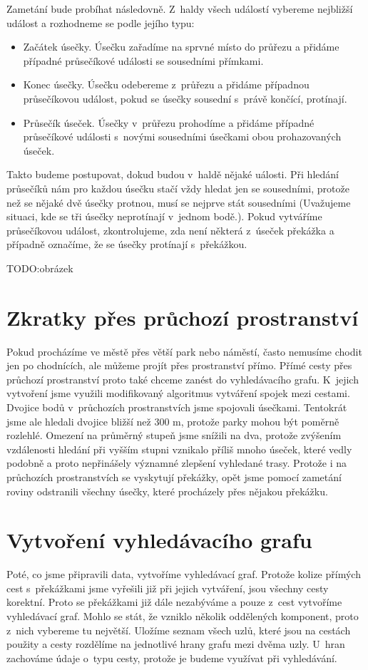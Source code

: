 Zametání bude probíhat následovně. Z~haldy všech událostí vybereme nejbližší
událost a rozhodneme se podle jejího typu:
\begin{itemize}
	\item {\tuc Začátek úsečky.}  Úsečku zařadíme na sprvné místo do
	průřezu a přidáme případné průsečíkové události se sousedními přímkami.
	\item {\tuc Konec úsečky.} Úsečku odebereme z~průřezu a přidáme
	případnou průsečíkovou událost, pokud se úsečky sousední s~právě
	končící, protínají.
	\item {\tuc Průsečík úseček.} Úsečky v~průřezu prohodíme a přidáme
	případné průsečíkové události s~novými sousedními úsečkami obou
	prohazovaných úseček.
\end{itemize}
Takto budeme postupovat, dokud budou v~haldě nějaké uálosti. Při hledání
průsečíků nám pro každou úsečku stačí vždy hledat jen se sousedními, protože než
se nějaké dvě úsečky protnou, musí se nejprve stát sousedními (Uvažujeme
situaci, kde se tři úsečky neprotínají v~jednom bodě.). Pokud vytváříme
průsečíkovou událost, zkontrolujeme, zda není některá z~úseček překážka a
případně označíme, že se úsečky protínají s~překážkou. 

TODO:obrázek

\section{Zkratky přes průchozí prostranství}
Pokud procházíme ve městě přes větší park nebo náměstí, často nemusíme chodit
jen po chodnících, ale můžeme projít přes prostranství přímo. Přímé cesty přes
průchozí prostranství proto také chceme zanést do vyhledávacího grafu. K~jejich
vytvoření jsme využili modifikovaný algoritmus vytváření spojek mezi cestami.
Dvojice bodů v~průchozích prostranstvích jsme spojovali úsečkami. Tentokrát jsme
ale hledali dvojice bližší než 300 m, protože parky mohou být poměrně rozlehlé.
Omezení na průměrný stupeň jsme snížili na dva, protože zvýšením vzdálenosti
hledání při vyšším stupni vznikalo příliš mnoho úseček, které vedly podobně a
proto nepřinášely významné zlepšení vyhledané trasy. Protože i na průchozích
prostranstvích se vyskytují překážky, opět jsme pomocí zametání roviny
odstranili všechny úsečky, které procházely přes nějakou překážku.

\section{Vytvoření vyhledávacího grafu}
Poté, co jsme připravili data, vytvoříme vyhledávací graf. Protože kolize
přímých cest s~překážkami jsme vyřešili již při jejich vytváření, jsou všechny
cesty korektní. Proto se překážkami již dále nezabýváme a pouze z~cest vytvoříme
vyhledávací graf. Mohlo se stát, že vzniklo několik oddělených komponent, proto
z~nich vybereme tu největší. Uložíme seznam všech uzlů, které jsou na cestách
použity a cesty rozdělíme na jednotlivé hrany grafu mezi dvěma uzly. U~hran
zachováme údaje o~typu cesty, protože je budeme využívat při vyhledávání.

